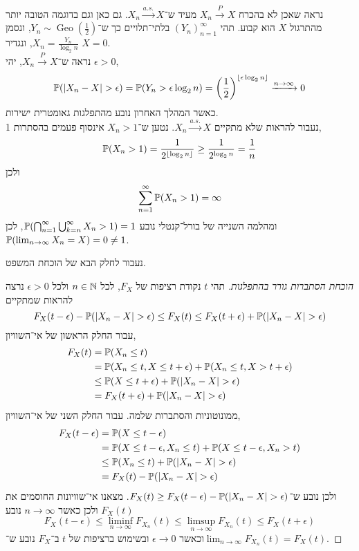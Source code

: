 \begin{example}
	נראה שאכן לא בהכרח $X_n \xrightarrow{P} X$ מעיד ש־$X_n \xrightarrow{a.s.} X$.
	גם כאן וגם בדוגמה הטובה יותר מהתרגול $X$ הוא קבוע.
	תהי ${(Y_n)}_{n = 1}^\infty$ בלתי־תלויים כך ש־$Y_n \sim \operatorname{Geo}(\frac{1}{2})$, ונסמן $X_n = \frac{Y_n}{\log_2 n}$, ונגדיר $X = 0$. \\
	נראה ש־$X_n \xrightarrow{P} X$,
	יהי $\epsilon > 0$,
	\[
		\mathbb{P}(|X_n - X| > \epsilon)
		= \mathbb{P}(Y_n > \epsilon \log_2 n)
		= {\left(\frac{1}{2}\right)}^{\lfloor \epsilon \log_2 n \rfloor}
		\xrightarrow{n \to \infty} 0
	\]
	כאשר המהלך האחרון נובע מהתפלגות גאומטרית ישירות. \\
	נעבור להראות שלא מתקיים $X_n \xrightarrow{a.s.} X$.
	נטען ש־$X_n > 1$ אינסוף פעמים בהסתרות 1,
	\[
		\mathbb{P}(X_n > 1)
		= \frac{1}{2^{\lfloor \log_2 n \rfloor}}
		\ge \frac{1}{2^{\log_2 n}}
		= \frac{1}{n}
	\]
	ולכן
	\[
		\sum_{n = 1}^{\infty} \mathbb{P}(X_n > 1) = \infty
	\]
	ומהלמה השנייה של בורל־קנטלי נובע $\mathbb{P}(\bigcap_{n = 1}^\infty \bigcup_{k = n}^\infty X_n > 1) = 1$,
	לכן $\mathbb{P}(\lim_{n \to \infty} X_n = X) = 0 \ne 1$.
\end{example}
נעבור לחלק הבא של הוכחת המשפט.
\begin{proof}[הוכחת הסתברות גורר בהתפלגות]
	תהי $t$ נקודת רציפות של $F_X$, לכל $n \in \mathbb{N}$ ולכל $\epsilon > 0$ נרצה להראות שמתקיים
	\[
		F_X(t - \epsilon) - \mathbb{P}(|X_n - X| > \epsilon)
		\le F_X(t)
		\le F_X(t + \epsilon) + \mathbb{P}(|X_n - X| > \epsilon)
	\]
	עבור החלק הראשון של אי־השוויון,
	\begin{align*}
		F_X(t)
		& = \mathbb{P}(X_n \le t) \\
		& = \mathbb{P}(X_n \le t, X \le t + \epsilon) + \mathbb{P}(X_n \le t, X > t + \epsilon) \\
		& \le \mathbb{P}(X \le t + \epsilon) + \mathbb{P}(|X_n - X| > \epsilon) \\
		& = F_X(t + \epsilon) + \mathbb{P}(|X_n - X| > \epsilon)
	\end{align*}
	ממונוטוניות והסתברות שלמה.
	עבור החלק השני של אי־השוויון,
	\begin{align*}
		F_X(t - \epsilon)
		& = \mathbb{P}(X \le t - \epsilon) \\
		& = \mathbb{P}(X \le t - \epsilon, X_n \le t) + \mathbb{P}(X \le t - \epsilon, X_n > t) \\
		& \le \mathbb{P}(X_n \le t) + \mathbb{P}(|X_n - X| > \epsilon) \\
		& = F_X(t) - \mathbb{P}(|X_n - X| > \epsilon)
	\end{align*}
	ולכן נובע ש־$F_X(t) \ge F_X(t - \epsilon) - \mathbb{P}(|X_n - X| > \epsilon)$.
	מצאנו אי־שוויונות החוסמים את $F_X(t)$ ולכן כאשר $n \to \infty$ נובע
	\[
		F_X(t - \epsilon)
		\le \liminf_{n \to \infty} F_{X_n}(t)
		\le \limsup_{n \to \infty} F_{X_n}(t)
		\le F_X(t + \epsilon)
	\]
	וכאשר $\epsilon \to 0$ ובשימוש ברציפות של $t$ ב־$F_X$ נובע ש־$\lim_{n \to \infty} F_{X_n}(t) = F_X(t)$.
\end{proof}
